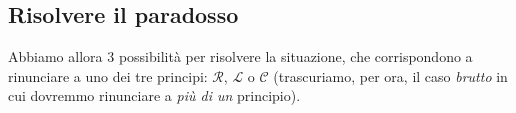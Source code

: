 \documentclass[../../FisicaTeorica.tex]{subfiles}
\begin{document}

\subsection{Risolvere il paradosso}
Abbiamo allora $3$ possibilità  per risolvere la situazione, che corrispondono a rinunciare a uno dei tre principi: $\mathcal{R}$, $\mathcal{L}$ o $\mathcal{C}$ (trascuriamo, per ora, il caso \textit{brutto} in cui dovremmo rinunciare a \textit{più di un} principio).\\
\end{document}
